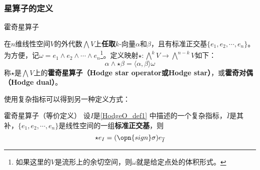






\subsubsection{星算子的定义}


\begin{definition}{霍奇星算子}\label{HodgeO_def2}

在$n$维线性空间$V$的外代数$\bigwedge V$上\textbf{任取}$k$-向量$\alpha$和$\beta$，且有标准正交基$\{e_1, e_2, \cdots, e_n\}$。为方便，记$\omega=e_1\wedge e_2\wedge \cdots\wedge e_n$\footnote{如果这里的$V$是流形上的余切空间，则$\omega$就是给定点处的体积形式。}。定义映射$\star:\bigwedge^k V \to \bigwedge^{n-k} V$如下：
\begin{equation}
\alpha\wedge \star\beta = \langle\alpha, \beta\rangle\omega
\end{equation}
称$\star$是$\bigwedge V$上的\textbf{霍奇星算子（Hodge star operator或Hodge star）}，或\textbf{霍奇对偶（Hodge dual）}。

\end{definition}


使用复杂指标可以得到另一种定义方式：


\begin{theorem}{霍奇星算子（等价定义）}\label{HodgeO_the1}
设$I$是\autoref{HodgeO_def1} 中描述的一个复杂指标，$\bar{I}$是其补，$\{e_1, e_2, \cdots, e_n\}$是线性空间的一组\textbf{标准正交基}，则
\begin{equation}
\star e_I = (\opn{sign}\sigma) e_{\overline{I}}
\end{equation}
\end{theorem}




